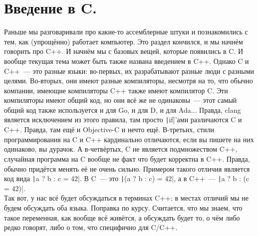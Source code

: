 \documentclass{article}
\begin{document}
    \section{Введение в C.}
    Раньше мы разговаривали про какие-то ассемблерные штуки и познакомились с тем, как (упрощённо) работает компьютер. Это раздел кончился, и мы начнём говорить про C++. И начнём мы с базовых вещей, которые появились в C. И вообще текущая тема может быть также названа введением в C++. Однако C и C++~--- это разные языки: во-первых, их разрабатывают разные люди с разными целями. Во-вторых, они имеют разные компиляторы, несмотря на то, что обычно компании, имеющие компиляторы C++ также имеют компилятор C. Эти компиляторы имеют общий код, но они всё же не одинаковы~--- этот самый общий код также используется и для Go, и для D, и для Ada... Правда, clang является исключением из этого правила, там просто \texttt|if|'ами различаются C и C++. Правда, там ещё и Objective-C и нечто ещё. В-третьих, стили программирования на C и C++ кардинально отличаются, если вы пишете на них одинаково, вы дурачок. А в-четвёртых, C не является подмножеством C++, случайная программа на C вообще не факт что будет корректна в C++. Правда, обычно придётся менять её не очень сильно. Примером такого отличия является код вида \texttt|a ? b : c = 42|. В C~--- это \texttt|(a ? b : c) = 42|, а в C++~--- \texttt|a ? b : (c = 42)|.\\
    Так вот, у нас всё будет обсуждаться в терминах C++: в местах отличий мы не будем обсуждать оба языка. Поправка по курсу. Считается, что мы знаем, что такое переменная, как вообще всё живётся, а обсуждать будет то, о чём либо редко говорят, либо о том, что специфично для C/C++.
\end{document}
